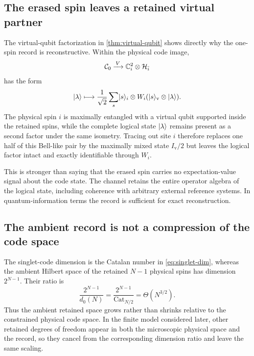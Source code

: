\subsection{The erased spin leaves a retained virtual partner}

The virtual-qubit factorization in \cref{thm:virtual-qubit} shows directly why the one-spin record is reconstructive.  Within the physical code image,
\begin{equation}
  \mathcal C_0
  \xrightarrow{\,V\,}
  \mathbb C^2_i\otimes\mathcal H_{\bar i}
\end{equation}
has the form
\begin{equation}
  \lvert \lambda\rangle
  \longmapsto
  \frac{1}{\sqrt2}
  \sum_s\lvert s\rangle_i\otimes
  W_i(\lvert s\rangle_{\mathrm v}\otimes\lvert \lambda\rangle).
\end{equation}
The physical spin $i$ is maximally entangled with a virtual qubit supported inside the retained spins, while the complete logical state $\lvert \lambda\rangle$ remains present as a second factor under the same isometry.  Tracing out site $i$ therefore replaces one half of this Bell-like pair by the maximally mixed state $I_{\mathrm v}/2$ but leaves the logical factor intact and exactly identifiable through $W_i$.

This is stronger than saying that the erased spin carries no expectation-value signal about the code state.  The channel retains the entire operator algebra of the logical state, including coherence with arbitrary external reference systems.  In quantum-information terms the record is sufficient for exact reconstruction.

\subsection{The ambient record is not a compression of the code space}

The singlet-code dimension is the Catalan number in \cref{eq:singlet-dim}, whereas the ambient Hilbert space of the retained $N-1$ physical spins has dimension $2^{N-1}$.  Their ratio is
\begin{equation}
  \frac{2^{N-1}}{d_0(N)}
  =\frac{2^{N-1}}{\operatorname{Cat}_{N/2}}
  =\Theta(N^{3/2}).
  \label{eq:dimension-ratio}
\end{equation}
Thus the ambient retained space grows rather than shrinks relative to the constrained physical code space.  In the finite model considered later, other retained degrees of freedom appear in both the microscopic physical space and the record, so they cancel from the corresponding dimension ratio and leave the same scaling.


